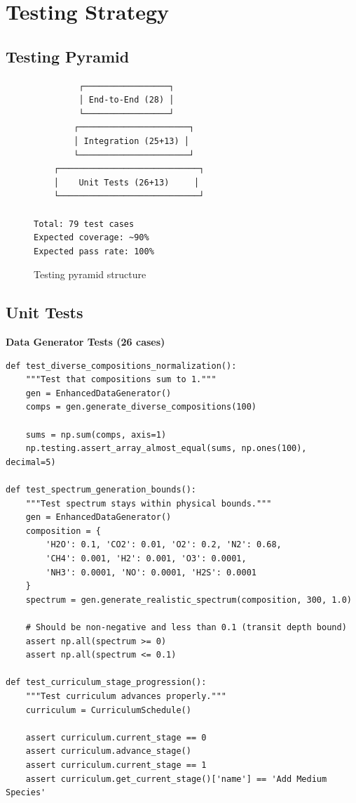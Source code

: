 \documentclass[12pt,a4paper,oneside]{report}
\begin{document}
\section{Testing Strategy}

\subsection{Testing Pyramid}

\begin{figure}[H]
\centering
\begin{verbatim}
         ┌─────────────────┐
         │ End-to-End (28) │
         └─────────────────┘
        ┌──────────────────────┐
        │ Integration (25+13) │
        └──────────────────────┘
    ┌────────────────────────────┐
    │    Unit Tests (26+13)     │
    └────────────────────────────┘

Total: 79 test cases
Expected coverage: ~90%
Expected pass rate: 100%
\end{verbatim}
\caption{Testing pyramid structure}
\end{figure}

\subsection{Unit Tests}

\textbf{Data Generator Tests (26 cases)}

\begin{lstlisting}
def test_diverse_compositions_normalization():
    """Test that compositions sum to 1."""
    gen = EnhancedDataGenerator()
    comps = gen.generate_diverse_compositions(100)

    sums = np.sum(comps, axis=1)
    np.testing.assert_array_almost_equal(sums, np.ones(100), decimal=5)

def test_spectrum_generation_bounds():
    """Test spectrum stays within physical bounds."""
    gen = EnhancedDataGenerator()
    composition = {
        'H2O': 0.1, 'CO2': 0.01, 'O2': 0.2, 'N2': 0.68,
        'CH4': 0.001, 'H2': 0.001, 'O3': 0.0001,
        'NH3': 0.0001, 'NO': 0.0001, 'H2S': 0.0001
    }
    spectrum = gen.generate_realistic_spectrum(composition, 300, 1.0)

    # Should be non-negative and less than 0.1 (transit depth bound)
    assert np.all(spectrum >= 0)
    assert np.all(spectrum <= 0.1)

def test_curriculum_stage_progression():
    """Test curriculum advances properly."""
    curriculum = CurriculumSchedule()

    assert curriculum.current_stage == 0
    assert curriculum.advance_stage()
    assert curriculum.current_stage == 1
    assert curriculum.get_current_stage()['name'] == 'Add Medium Species'
\end{lstlisting}
\end{document}
